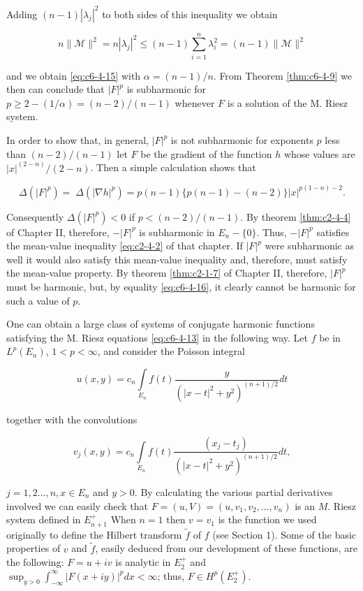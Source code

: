 Adding $(n - 1)|\lambda_j|^2$ to both sides of this inequality we obtain

\[
n\|\mathcal{M}\|^{2}=n|\lambda_{j}|^{2}\leq(n-1)\sum_{i=1}^{n}\lambda_{i}^{2}=(n-1)\|\mathcal{M}\|^{2}
\]

and we obtain \eqref{eq:c6-4-15} with $\alpha = (n-1)/n$. From Theorem \ref{thm:c6-4-9} we then can conclude that $|F|^{p}$ is subharmonic for $p \geq 2 - (1/\alpha) = (n-2)/(n-1)$ whenever $F$ is a solution of the M. Riesz system.

In order to show that, in general, $|F|^p$ is not subharmonic for exponents $p$ less than $(n - 2)/(n - 1)$ let $F$ be the gradient of the function $h$ whose values are $|x|^{(2 - n)}/(2 - n)$. Then a simple calculation shows that

\begin{equation}\label{eq:c6-4-16}
\Delta(|F|^{p})=\;\Delta(|\nabla h|^{p})=p(n-1)\{p(n-1)-(n-2)\}|x|^{p(1-n)-2}.
\end{equation}

Consequently $\Delta(|F|^{p}) < 0$ if $p < (n-2)/(n-1)$. By theorem \eqref{thm:c2-4-4} of Chapter II, therefore, $-|F|^{p}$ is subharmonic in $E_n - \{0\}$. Thus, $-|F|^{p}$ satisfies the mean-value inequality \eqref{eq:c2-4-2} of that chapter. If $|F|^{p}$ were subharmonic as well it would also satisfy this mean-value inequality and, therefore, must satisfy the mean-value property. By theorem \eqref{thm:c2-1-7} of Chapter II, therefore, $|F|^{p}$ must be harmonic, but, by equality \eqref{eq:c6-4-16}, it clearly cannot be harmonic for such a value of $p$.

One can obtain a large class of systems of conjugate harmonic functions satisfying the M. Riesz equations \eqref{eq:c6-4-13} in the following way. Let $f$ be in $L^{p}(E_{n})$, $1 < p < \infty$, and consider the Poisson integral

\[
u(x,y)=c_{n}\int\limits_{E_{n}}f(t)\frac{y}{(|x-t|^{2}+y^{2})^{(n+1)/2}}dt
\]

together with the convolutions

\[
v_{j}(x,y)=c_{n}\int\limits_{E_{n}}f(t)\frac{(x_{j}-t_{j})}{(|x-t|^{2}+y^{2})^{(n+1)/2}}dt,
\]

$j=1,2\ldots,n,x\in E_n$ and $y>0$. By calculating the various partial derivatives involved we can easily check that $F=(u,V)=(u,v_1,v_2,\ldots,v_n)$ is an $M$. Riesz system defined in $E_{n+1}^+$ When $n=1$ then $v=v_1$ is the function we used originally to define the Hilbert transform $\tilde{f}$ of $f$ (see Section 1). Some of the basic properties of $v$ and $\tilde{f}$, easily deduced from our development of these functions, are the following: $F=u+iv$ is analytic in $E_2^+$ and $\sup_{y>0} \int_{-\infty}^{\infty} |F(x+iy)|^p dx<\infty$; thus, $F\in H^p(E_2^+)$.

